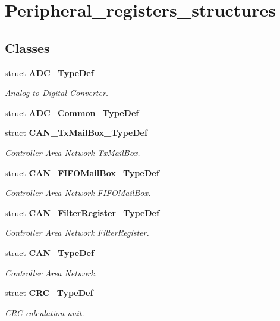 \section{Peripheral\+\_\+registers\+\_\+structures}
\label{group__Peripheral__registers__structures}
\subsection*{Classes}
\begin{DoxyCompactItemize}
\item 
struct \textbf{ A\+D\+C\+\_\+\+Type\+Def}
\begin{DoxyCompactList}\small\item\em Analog to Digital Converter. \end{DoxyCompactList}\item 
struct \textbf{ A\+D\+C\+\_\+\+Common\+\_\+\+Type\+Def}
\item 
struct \textbf{ C\+A\+N\+\_\+\+Tx\+Mail\+Box\+\_\+\+Type\+Def}
\begin{DoxyCompactList}\small\item\em Controller Area Network Tx\+Mail\+Box. \end{DoxyCompactList}\item 
struct \textbf{ C\+A\+N\+\_\+\+F\+I\+F\+O\+Mail\+Box\+\_\+\+Type\+Def}
\begin{DoxyCompactList}\small\item\em Controller Area Network F\+I\+F\+O\+Mail\+Box. \end{DoxyCompactList}\item 
struct \textbf{ C\+A\+N\+\_\+\+Filter\+Register\+\_\+\+Type\+Def}
\begin{DoxyCompactList}\small\item\em Controller Area Network Filter\+Register. \end{DoxyCompactList}\item 
struct \textbf{ C\+A\+N\+\_\+\+Type\+Def}
\begin{DoxyCompactList}\small\item\em Controller Area Network. \end{DoxyCompactList}\item 
struct \textbf{ C\+R\+C\+\_\+\+Type\+Def}
\begin{DoxyCompactList}\small\item\em C\+RC calculation unit. \end{DoxyCompactList}\item 

\end{DoxyCompactItemize}
